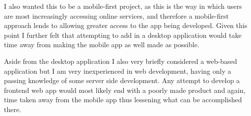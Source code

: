 I also wanted this to be a mobile-first project, as this is the way in which users are most increasingly accessing online services, and therefore a mobile-first approach lends to allowing greater access to the app being developed. Given this point I further felt that attempting to add in a desktop application would take time away from making the mobile app as well made as possible.

Aside from the desktop application I also very briefly considered a web-based application but I am very inexperienced in web development, having only a passing knowledge of some server side development. Any attempt to develop a frontend web app would most likely end with a poorly made product and again, time taken away from the mobile app thus lessening what can be accomplished there.



